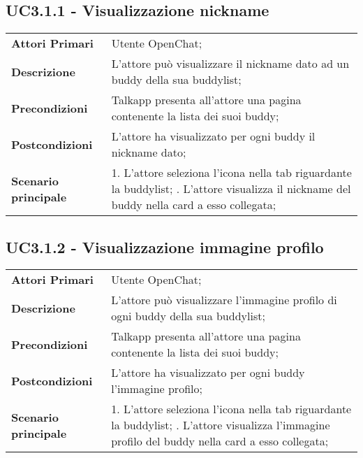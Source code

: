 \subsection{UC3.1.1 - Visualizzazione nickname}
	\begin{center}
	\bgroup
	\def\arraystretch{1.8}     
	\begin{longtable}{  p{4cm} | p{9.5cm} } 
		\textbf{Attori Primari} & Utente OpenChat; \\ 
		\textbf{Descrizione} &  L'attore può visualizzare il nickname dato ad un buddy della sua buddylist; \\ 
		\textbf{Precondizioni}  & Talkapp presenta all'attore una pagina contenente la lista dei suoi buddy; \\
		\textbf{Postcondizioni} & L'attore ha visualizzato per ogni buddy il nickname dato;  \\ 
		\textbf{Scenario principale} & 
		1. L'attore seleziona l'icona nella tab riguardante la buddylist; \newline
		2. L'attore visualizza il nickname del buddy nella card a esso collegata;
	\end{longtable}
	\egroup
\end{center}
\subsection{UC3.1.2 - Visualizzazione immagine profilo}
	\begin{center}
	\bgroup
	\def\arraystretch{1.8}     
	\begin{longtable}{  p{4cm} | p{9.5cm} } 
		\textbf{Attori Primari} & Utente OpenChat; \\ 
		\textbf{Descrizione} &  L'attore può visualizzare l'immagine profilo di ogni buddy della sua buddylist; \\ 
		\textbf{Precondizioni}  & Talkapp presenta all'attore una pagina contenente la lista dei suoi buddy; \\
		\textbf{Postcondizioni} & L'attore ha visualizzato per ogni buddy  l'immagine profilo;  \\ 
		\textbf{Scenario principale} & 
		1. L'attore seleziona l'icona nella tab riguardante la buddylist; \newline
		2. L'attore visualizza l'immagine profilo del buddy nella card a esso collegata;
	\end{longtable}
	\egroup
\end{center}
